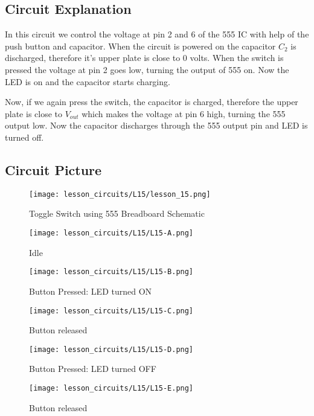 \subsection{Circuit Explanation}
In this circuit we control the voltage at pin 2 and 6 of the 555 IC with help of the push button and capacitor. When the circuit is 
powered on the capacitor $C_2$ is discharged, therefore it's upper plate is close to 0 volts. When the switch is pressed the voltage 
at pin 2 goes low, turning the output of 555 on. Now the LED is on and the capacitor starts charging.

Now, if we again press the switch, the capacitor is charged, therefore the upper plate is close to $V_{out}$ which makes the voltage 
at pin 6 high, turning the 555 output low. Now the capacitor discharges through the 555 output pin and LED is turned off.
\subsection{Circuit Picture}
\begin{figure}[!htp]
    \centering
    \texttt{[image: lesson\_circuits/L15/lesson\_15.png]}
    \caption{Toggle Switch using 555 Breadboard Schematic}
    \label{fig:555_ts_sch}
\end{figure}
\begin{figure}[!htp]
    \centering
    \texttt{[image: lesson\_circuits/L15/L15-A.png]}
    \caption{Idle}
    \label{fig:555_ts_obb}
\end{figure}
\begin{figure}[!htp]
    \centering
    \texttt{[image: lesson\_circuits/L15/L15-B.png]}
    \caption{Button Pressed: LED turned ON}
    \label{fig:555_ts_obb1}
\end{figure}
\begin{figure}[!htp]
    \centering
    \texttt{[image: lesson\_circuits/L15/L15-C.png]}
    \caption{Button released}
    \label{fig:555_ts_obb2}
\end{figure}
\begin{figure}[!htp]
    \centering
    \texttt{[image: lesson\_circuits/L15/L15-D.png]}
    \caption{Button Pressed: LED turned OFF}
    \label{fig:555_ts_obb3}
\end{figure}
\begin{figure}[!htp]
    \centering
    \texttt{[image: lesson\_circuits/L15/L15-E.png]}
    \caption{Button released}
    \label{fig:555_ts_obb4}
\end{figure}
